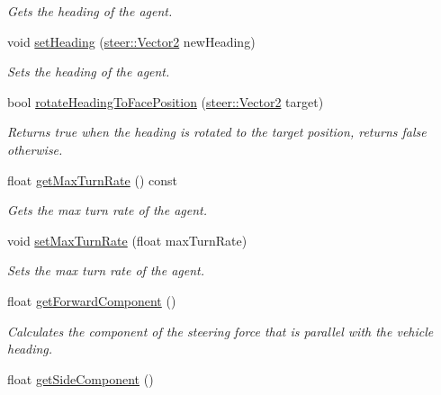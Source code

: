 \begin{DoxyCompactItemize}
\begin{DoxyCompactList}\small\item\em Gets the heading of the agent. \end{DoxyCompactList}\item 
void \hyperlink{classsteer_1_1_agent_a492dc3524515e1d7890002c606163481}{set\-Heading} (\hyperlink{structsteer_1_1_vector2}{steer\-::\-Vector2} new\-Heading)
\begin{DoxyCompactList}\small\item\em Sets the heading of the agent. \end{DoxyCompactList}\item 
bool \hyperlink{classsteer_1_1_agent_aadf0d39706259827d9273578b4987e18}{rotate\-Heading\-To\-Face\-Position} (\hyperlink{structsteer_1_1_vector2}{steer\-::\-Vector2} target)
\begin{DoxyCompactList}\small\item\em Returns true when the heading is rotated to the target position, returns false otherwise. \end{DoxyCompactList}\item 
\hypertarget{classsteer_1_1_agent_a40fc7801b000897c5f5434ce7d1305a6}{float \hyperlink{classsteer_1_1_agent_a40fc7801b000897c5f5434ce7d1305a6}{get\-Max\-Turn\-Rate} () const }\label{classsteer_1_1_agent_a40fc7801b000897c5f5434ce7d1305a6}

\begin{DoxyCompactList}\small\item\em Gets the max turn rate of the agent. \end{DoxyCompactList}\item 
void \hyperlink{classsteer_1_1_agent_a99de7872a86641efab3a281e2a81fa5a}{set\-Max\-Turn\-Rate} (float max\-Turn\-Rate)
\begin{DoxyCompactList}\small\item\em Sets the max turn rate of the agent. \end{DoxyCompactList}\item 
\hypertarget{classsteer_1_1_agent_a3a96839bccd2e3ba4c828abc0ce98504}{float \hyperlink{classsteer_1_1_agent_a3a96839bccd2e3ba4c828abc0ce98504}{get\-Forward\-Component} ()}\label{classsteer_1_1_agent_a3a96839bccd2e3ba4c828abc0ce98504}

\begin{DoxyCompactList}\small\item\em Calculates the component of the steering force that is parallel with the vehicle heading. \end{DoxyCompactList}\item 
\hypertarget{classsteer_1_1_agent_a8eb6abfe81ef28f6f6ed463b9a0cbb03}{float \hyperlink{classsteer_1_1_agent_a8eb6abfe81ef28f6f6ed463b9a0cbb03}{get\-Side\-Component} ()}\label{classsteer_1_1_agent_a8eb6abfe81ef28f6f6ed463b9a0cbb03}


\end{DoxyCompactItemize}
